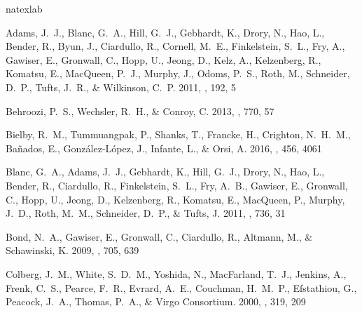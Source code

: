 \documentclass{emulateapj}
\begin{document}

%
\begin{thebibliography}{43}
\expandafter\ifx\csname natexlab\endcsname\relax\def\natexlab#1{#1}\fi

{Adams}, J.~J., {Blanc}, G.~A., {Hill}, G.~J., {Gebhardt}, K., {Drory}, N.,
  {Hao}, L., {Bender}, R., {Byun}, J., {Ciardullo}, R., {Cornell}, M.~E.,
  {Finkelstein}, S.~L., {Fry}, A., {Gawiser}, E., {Gronwall}, C., {Hopp}, U.,
  {Jeong}, D., {Kelz}, A., {Kelzenberg}, R., {Komatsu}, E., {MacQueen}, P.~J.,
  {Murphy}, J., {Odoms}, P.~S., {Roth}, M., {Schneider}, D.~P., {Tufts}, J.~R.,
  \& {Wilkinson}, C.~P. 2011, \apjs, 192, 5

{Behroozi}, P.~S., {Wechsler}, R.~H., \& {Conroy}, C. 2013, \apj, 770, 57

{Bielby}, R.~M., {Tummuangpak}, P., {Shanks}, T., {Francke}, H., {Crighton},
  N.~H.~M., {Ba{\~n}ados}, E., {Gonz{\'a}lez-L{\'o}pez}, J., {Infante}, L., \&
  {Orsi}, A. 2016, \mnras, 456, 4061

{Blanc}, G.~A., {Adams}, J.~J., {Gebhardt}, K., {Hill}, G.~J., {Drory}, N.,
  {Hao}, L., {Bender}, R., {Ciardullo}, R., {Finkelstein}, S.~L., {Fry}, A.~B.,
  {Gawiser}, E., {Gronwall}, C., {Hopp}, U., {Jeong}, D., {Kelzenberg}, R.,
  {Komatsu}, E., {MacQueen}, P., {Murphy}, J.~D., {Roth}, M.~M., {Schneider},
  D.~P., \& {Tufts}, J. 2011, \apj, 736, 31

{Bond}, N.~A., {Gawiser}, E., {Gronwall}, C., {Ciardullo}, R., {Altmann}, M.,
  \& {Schawinski}, K. 2009, \apj, 705, 639

{Colberg}, J.~M., {White}, S.~D.~M., {Yoshida}, N., {MacFarland}, T.~J.,
  {Jenkins}, A., {Frenk}, C.~S., {Pearce}, F.~R., {Evrard}, A.~E., {Couchman},
  H.~M.~P., {Efstathiou}, G., {Peacock}, J.~A., {Thomas}, P.~A., \& {Virgo
  Consortium}. 2000, \mnras, 319, 209


\end{thebibliography}
\end{document}
